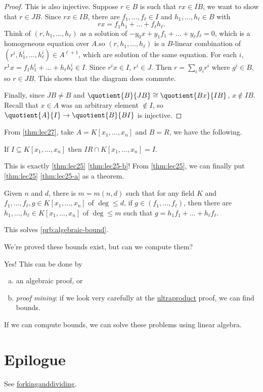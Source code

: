 \begin{proof}
	This is also injective. Suppose \(r\in B\) is such that \(rx\in IB\), we want to show that \(r\in JB\). Since \(rx \in I B\), there are \(f_1, \dots , f_{\ell } \in I\) and \(h_1, \dots , h_{\ell } \in B\) with
	\[
		rx = f_1 h_1 + \dots + f_{\ell } h_{\ell }.
	\]
	Think of \((r, h_1, \dots , h_{\ell } )\) as a solution of \(- y_0 x + y_1 f_1 + \dots + y_{\ell } f_{\ell } = 0\), which is a homogeneous equation over \(A\).so \((r, h_1, \dots , h_{\ell } )\) is a \(B\)-linear combination of \((r^i, h_1^i, \dots , h_{\ell }^i )\in A^{\ell + 1}\), which are solution of the same equation. For each \(i\), \(r^1 x = f_1 h_1^i + \dots + h_{\ell }h_{\ell } ^i\in I\). Since \(r^i x \in I\), \(r^i \in J\). Then \(r = \sum_{i} g_i r^i\) where \(g^i \in B\), so \(r\in JB\). This shows that the diagram does commute.

	Finally, since \(JB \neq B\) and \(\quotient{B}{JB} \cong \quotient{Bx}{IB} \), \(x \notin IB\). Recall that \(x\in A\) was an arbitrary element \(\notin I\), so \(\quotient{A}{I} \to \quotient{B}{BI} \) is injective.
\end{proof}

From \autoref{thm:lec27}, take \(A = K[x_1, \dots , x_n]\) and \(B = R\), we have the following.

\begin{corollary}
	If \(I \subseteq K[x_1, \dots , x_n]\) then \(IR \cap K[x_1, \dots , x_n] = I\).
\end{corollary}

This is exactly \autoref{thm:lec25} \autoref{thm:lec25-b}! From \autoref{thm:lec25}, we can finally put \autoref{thm:lec25} \autoref{thm:lec25-a} as a theorem.

\begin{theorem}
	Given \(n\) and \(d\), there is \(m = m(n, d)\) such that for any field \(K\) and \(f_1, \dots , f_{\ell }, g \in K[x_1, \dots , x_n]\) of \(\deg \leq d\), if \(g\in (f_1, \dots , f_{\ell } )\), then there are \(h_1, \dots , h_{\ell } \in K[x_1, \dots , x_n]\) of \(\deg \leq m\) such that \(g = h_1 f_1 + \dots + h_{\ell } f_{\ell } \).
\end{theorem}

This solves \autoref{prb:algebraic-bound}.

\begin{problem*}
	We're proved these bounds exist, but can we compute them?
\end{problem*}
\begin{answer}
	Yes! This can be done by
	\begin{enumerate}[(a)]
		\item an algebraic proof, or
		\item \emph{proof mining}: if we look very carefully at the \hyperref[def:ultraproduct]{ultraproduct} proof, we can find bounds.
	\end{enumerate}
\end{answer}

\begin{remark}
	If we can compute bounds, we can solve these problems using linear algebra.
\end{remark}

\chapter{Epilogue}
See \href{www.forkinganddividing.com}{forkinganddividing}.